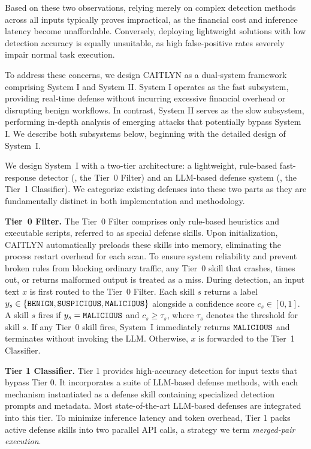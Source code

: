 

Based on these two observations, relying merely on complex
detection methods across all inputs typically proves impractical, as the financial
cost and inference latency become unaffordable. Conversely, deploying
lightweight solutions with low detection accuracy is equally
unsuitable, as high false-positive rates severely impair normal
task execution.

To address these concerns, we design CAITLYN as a dual-system
framework comprising System I and System II. System I operates as the
fast subsystem, providing real-time defense without incurring
excessive financial overhead or disrupting benign workflows. In
contrast, System II serves as the slow subsystem, performing in-depth
analysis of emerging attacks that potentially bypass System I.
We describe both subsystems below, beginning with the detailed design
of System~I.

We design System~I with a two-tier architecture: a lightweight,
rule-based fast-response detector (\ie, the Tier~0 Filter) and an
LLM-based defense system (\ie, the Tier~1 Classifier). We categorize
existing defenses into these two parts as they are fundamentally
distinct in both implementation and methodology.

\noindent
\textbf{Tier~0 Filter.}
The Tier~0 Filter comprises only rule-based heuristics and executable
scripts, referred to as special defense skills. Upon initialization,
CAITLYN automatically preloads these skills into memory, eliminating
the process restart overhead for each scan. To ensure system
reliability and prevent broken rules from blocking ordinary traffic,
any Tier~0 skill that crashes, times out, or returns malformed output
is treated as a miss.
During detection, an input text $x$ is first routed to the Tier~0
Filter. Each skill $s$ returns a label $y_s \in \{\text{\texttt{BENIGN}},
\text{\texttt{SUSPICIOUS}}, \text{\texttt{MALICIOUS}}\}$ alongside a confidence score $c_s
\in [0,1]$. A skill $s$ fires if $y_s = \text{\texttt{MALICIOUS}}$ and $c_s \geq
\tau_s$, where $\tau_s$ denotes the threshold for skill $s$. If any
Tier~0 skill fires, System~I immediately returns $\text{\texttt{MALICIOUS}}$ and
terminates without invoking the LLM. Otherwise, $x$ is forwarded to
the Tier~1 Classifier.

\noindent
\textbf{Tier 1 Classifier.}
Tier 1 provides high-accuracy detection for input texts that bypass
Tier 0. It incorporates a suite of LLM-based defense methods, with
each mechanism instantiated as a defense skill containing specialized
detection prompts and metadata. Most state-of-the-art LLM-based
defenses are integrated into this tier.
To minimize inference latency and token overhead, Tier 1 packs active
defense skills into two parallel API calls, a strategy we term
\emph{merged-pair execution}.

